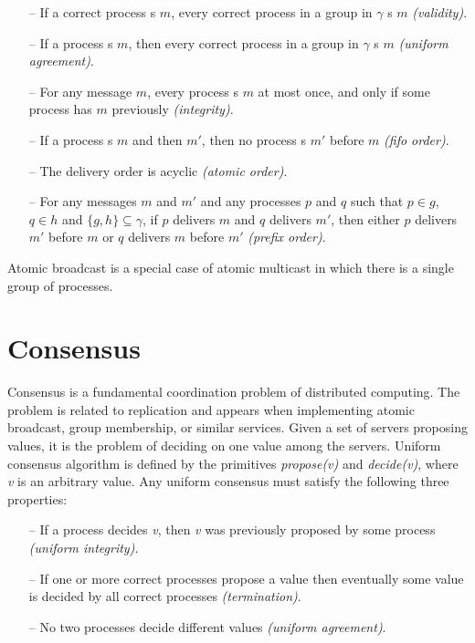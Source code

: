 \begin{itemize}

    \item[--] If a correct process \amcast{}s $m$, every correct process in a
      group in $\gamma$ \amdel{}s $m$ \emph{(validity)}.

    \item[--] If a process \amdel{}s $m$, then every correct process in a group
      in $\gamma$ \amdel{}s $m$ \emph{(uniform agreement)}.

    \item[--] For any message $m$, every process \amdel{}s $m$ at most once, and
      only if some process has \amcast{} $m$ previously \emph{(integrity)}.

    \item[--] If a process \amcast{}s $m$ and then $m'$, then no process
    \amdel{}s $m'$ before $m$ \emph{(fifo order)}.

    \item[--] The delivery order is acyclic \emph{(atomic order)}.

    \item[--] For any messages $m$ and $m'$ and any processes $p$ and $q$ such
      that $p \in g$, $q \in h$ and $\{ g, h \} \subseteq \gamma$, if $p$
      delivers $m$ and $q$ delivers $m'$, then either $p$ delivers $m'$ before
      $m$ or $q$ delivers $m$ before $m'$ \emph{(prefix order)}.

\end{itemize}

Atomic broadcast is a special case of atomic multicast in which there
is a single group of processes.

\section{Consensus}
Consensus is a fundamental coordination problem of distributed computing. The
problem is related to replication and appears when implementing atomic
broadcast, group membership, or similar services. Given a set of servers
proposing values, it is the problem of deciding on one value among the servers.
Uniform consensus algorithm  is defined by the primitives \emph{propose(v)} and
\emph{decide(v)}, where \emph{v} is an arbitrary value. Any uniform consensus
must satisfy the following three properties:
\begin{itemize}

  \item[--] If a process decides \emph{v}, then \emph{v} was previously
  proposed by some process \emph{(uniform integrity)}.

  \item[--] If one or more correct processes propose a value then eventually
  some value is decided by all correct processes \emph{(termination)}.

  \item[--] No two processes decide different values \emph{(uniform agreement)}.

\end{itemize}

